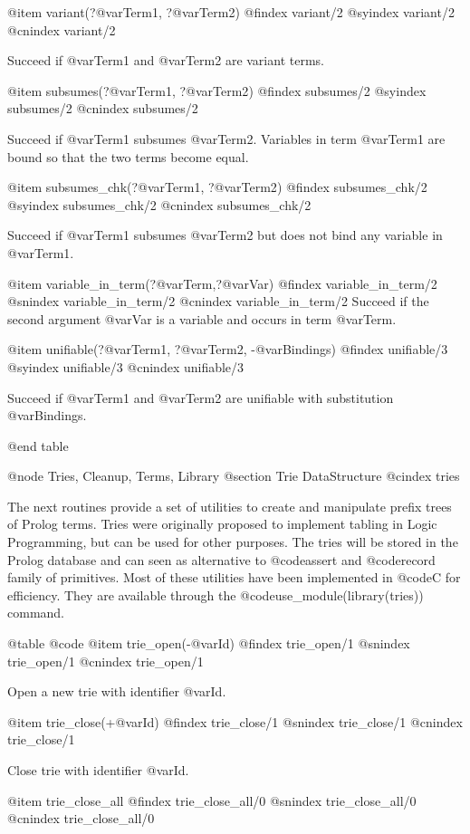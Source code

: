 {{{{{{{{@item variant(?@var{Term1}, ?@var{Term2})
@findex  variant/2
@syindex variant/2
@cnindex variant/2

Succeed if @var{Term1} and @var{Term2} are variant terms.

@item subsumes(?@var{Term1}, ?@var{Term2})
@findex  subsumes/2
@syindex subsumes/2
@cnindex subsumes/2

Succeed if @var{Term1} subsumes @var{Term2}.  Variables in term
@var{Term1} are bound so that the two terms become equal.


@item subsumes_chk(?@var{Term1}, ?@var{Term2})
@findex  subsumes_chk/2
@syindex subsumes_chk/2
@cnindex subsumes_chk/2

Succeed if @var{Term1} subsumes @var{Term2} but does not bind any
variable in @var{Term1}.

@item variable_in_term(?@var{Term},?@var{Var})
@findex variable_in_term/2
@snindex variable_in_term/2
@cnindex variable_in_term/2
Succeed if the second argument @var{Var} is a variable and occurs in
term @var{Term}.

@item unifiable(?@var{Term1}, ?@var{Term2}, -@var{Bindings})
@findex  unifiable/3
@syindex unifiable/3
@cnindex unifiable/3

Succeed if @var{Term1} and @var{Term2} are unifiable with substitution
@var{Bindings}.

@end table

@node Tries, Cleanup, Terms, Library
@section Trie DataStructure
@cindex tries

The next routines provide a set of utilities to create and manipulate
prefix trees of Prolog terms. Tries were originally proposed to
implement tabling in Logic Programming, but can be used for other
purposes. The tries will be stored in the Prolog database and can seen
as alternative to @code{assert} and @code{record} family of
primitives. Most of these utilities have been implemented in @code{C}
for efficiency. They are available through the
@code{use_module(library(tries))} command.

@table @code
@item trie_open(-@var{Id})
@findex trie_open/1
@snindex trie_open/1
@cnindex trie_open/1

Open a new trie with identifier @var{Id}.

@item trie_close(+@var{Id})
@findex trie_close/1
@snindex trie_close/1
@cnindex trie_close/1

Close trie with identifier @var{Id}.

@item trie_close_all
@findex trie_close_all/0
@snindex trie_close_all/0
@cnindex trie_close_all/0

}}}}}}}}
